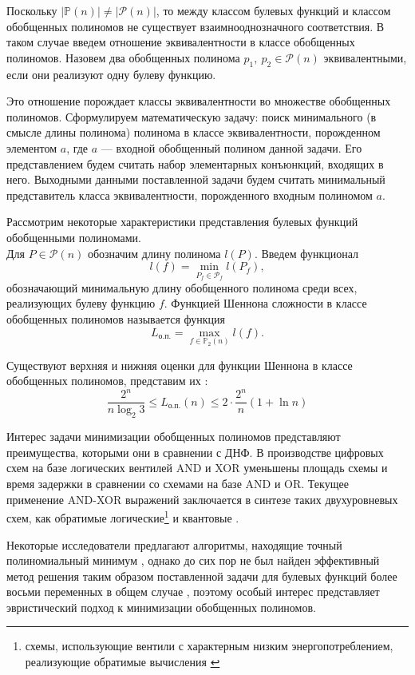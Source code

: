 \documentclass[a4paper,12pt,titlepage,finall]{article}
\begin{document}
Поскольку $ \left| \mathbb{P}(n) \right| \ne \left| \mathcal{P}(n) \right| $, то между классом булевых функций и классом обобщенных полиномов не существует взаимнооднозначного соответствия. В таком случае введем отношение эквивалентности в классе обобщенных полиномов. Назовем два обобщенных полинома $ p_1,\ p_2 \in \mathcal{P}(n) $ эквивалентными, если они реализуют одну булеву функцию.

Это отношение порождает классы эквивалентности во множестве обобщенных полиномов. Сформулируем математическую задачу: поиск минимального (в смысле длины полинома) полинома в классе эквивалентности, порожденном элементом $ a $, где $ a $ --- входной обобщенный полином данной задачи. Его представлением будем считать набор элементарных конъюнкций, входящих в него. Выходными данными поставленной задачи будем считать минимальный представитель класса эквивалентности, порожденного входным полиномом $ a $.

Рассмотрим некоторые характеристики представления булевых функций обобщенными полиномами.\\
Для $ P \in \mathcal{P}(n) $ обозначим длину полинома $ l(P) $. Введем функционал
$$ l(f) = \min\limits_{P_f \in \mathcal{P}_f} l(P_f), $$
обозначающий минимальную длину обобщенного полинома среди всех, реализующих булеву функцию $ f $. Функцией Шеннона сложности в классе обобщенных полиномов называется функция
$$ L_\text{о.п.} = \max\limits_{f \in \mathbb{P}_2(n)} l(f). $$

Существуют верхняя и нижняя оценки для функции Шеннона в классе обобщенных полиномов, представим их \cite{selezn}:
$$ \frac{2^n}{n \log_2 3} \le L_\text{о.п.}(n) \le 2 \cdot \frac{2^n}{n} (1 + \ln n) $$

Интерес задачи минимизации обобщенных полиномов представляют преимущества, которыми они в сравнении с ДНФ. В производстве цифровых схем на базе логических вентилей \textsc{AND} и \textsc{XOR} уменьшены площадь схемы и время задержки \cite{delay} в сравнении со схемами на базе \textsc{AND} и \textsc{OR}. Текущее применение \textsc{AND-XOR} выражений заключается в синтезе таких двухуровневых схем, как обратимые логические\footnote{схемы, использующие вентили с характерным низким энергопотреблением, реализующие обратимые вычисления \cite{revsynth}} \cite{reversible} и квантовые \cite{quantum}.

Некоторые исследователи предлагают алгоритмы, находящие точный полиномиальный минимум \cite{min-tau} \cite{exact6} \cite{exact}, однако до сих пор не был найден эффективный метод решения таким образом поставленной задачи для булевых функций более восьми переменных в общем случае \cite{exact8}, поэтому особый интерес представляет эвристический подход к минимизации обобщенных полиномов.
\end{document}
